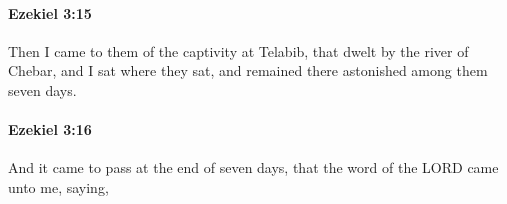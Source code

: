 		\paragraph{Ezekiel 3:15} %
			\label{EZEKIEL-3-15}

			Then I came to them of the captivity at Telabib, that dwelt by the river of Chebar, and I sat where they sat, and remained there astonished among them seven days.


		\paragraph{Ezekiel 3:16} %
			\label{EZEKIEL-3-16}

			And it came to pass at the end of seven days, that the word of the LORD came unto me, saying,


